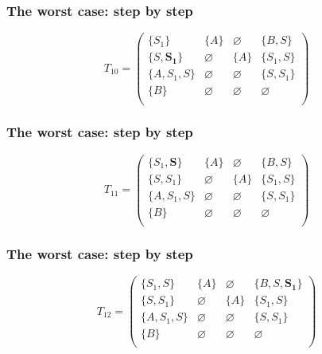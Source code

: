 \documentclass[xcolor=table]{beamer}
\begin{document}
\begin{frame}[noframenumbering]

  \frametitle{The worst case: step by step}
\begin{figure}[h]
\[
T_{10} = \begin{pmatrix}
\{S_1\}     & \{A\}       & \varnothing & \{B, S\}    \\
\{S, \pmb{S_1}\}       & \varnothing & \{A\}       & \{S_1, S\}     \\
\{A, S_1, S\}  & \varnothing & \varnothing & \{S, S_1\} \\
\{B\}       & \varnothing & \varnothing & \varnothing \\
\end{pmatrix}
\]
\label{ExampleQueryFirstIteration}
\end{figure}
\end{frame}

\begin{frame}[noframenumbering]

  \frametitle{The worst case: step by step}

\begin{figure}[h]
\[
T_{11} = \begin{pmatrix}
\{S_1, \pmb{S}\}     & \{A\}       & \varnothing & \{B, S\}    \\
\{S, S_1\}       & \varnothing & \{A\}       & \{S_1, S\}     \\
\{A, S_1, S\}  & \varnothing & \varnothing & \{S, S_1\} \\
\{B\}       & \varnothing & \varnothing & \varnothing \\
\end{pmatrix}
\]
\label{ExampleQueryFirstIteration}
\end{figure}
\end{frame}

\begin{frame}[noframenumbering]

  \frametitle{The worst case: step by step}

\begin{figure}[h]
\[
T_{12} = \begin{pmatrix}
\{S_1, S\}     & \{A\}       & \varnothing & \{B, S, \pmb{S_1}\}    \\
\{S, S_1\}       & \varnothing & \{A\}       & \{S_1, S\}     \\
\{A, S_1, S\}  & \varnothing & \varnothing & \{S, S_1\} \\
\{B\}       & \varnothing & \varnothing & \varnothing \\
\end{pmatrix}
\]
\label{ExampleQueryFirstIteration}
\end{figure}
\end{frame}
\end{document}
